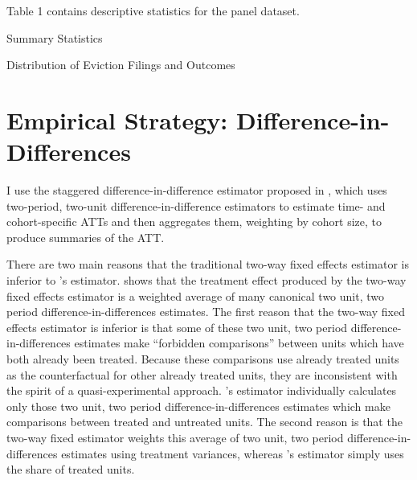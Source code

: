 \documentclass[12pt]{article}
\begin{document}
    Table 1 contains descriptive statistics for the panel dataset. 
    
    



         \begin{table}[H]
            \centering
            \small
            
            \caption{Summary Statistics}
            \label{tab:table_1}
        \end{table}


       \begin{table}[H]
            \centering
            \small
            
            \caption{Distribution of Eviction Filings and Outcomes}
            \label{tab:my_label}
        \end{table}


\section{Empirical Strategy: Difference-in-Differences}
I use the staggered difference-in-difference estimator proposed in \cite{callaway_difference--differences_2021}, which uses two-period, two-unit difference-in-difference estimators to estimate time- and cohort-specific ATTs and then aggregates them, weighting by cohort size, to produce summaries of the ATT. 

There are two main reasons that the traditional two-way fixed effects estimator is inferior to \cite{callaway_difference--differences_2021}'s estimator. \cite{goodman-bacon_difference--differences_2021} shows that the treatment effect produced by the two-way fixed effects estimator is a weighted average of many canonical two unit, two period difference-in-differences estimates. The first reason that the two-way fixed effects estimator is inferior is that some of these two unit, two period difference-in-differences estimates make ``forbidden comparisons'' between units which have both already been treated. Because these comparisons use already treated units as the counterfactual for other already treated units, they are inconsistent with the spirit of a quasi-experimental approach. \cite{callaway_difference--differences_2021}'s estimator individually calculates only those two unit, two period difference-in-differences estimates which make comparisons between treated and untreated units. The second reason is that the two-way fixed estimator weights this average of two unit, two period difference-in-differences estimates using treatment variances, whereas \cite{callaway_difference--differences_2021}'s estimator simply uses  the share of treated units.
\end{document}
